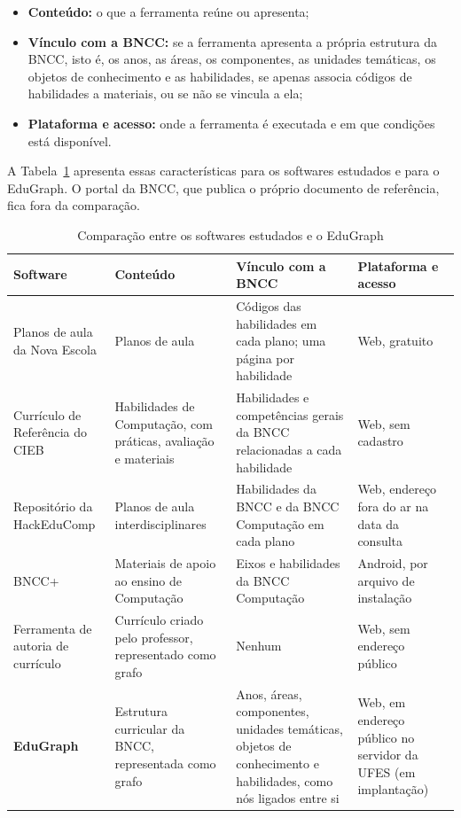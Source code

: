 \begin{itemize}
    \item \textbf{Conteúdo:} o que a ferramenta reúne ou apresenta;
    \item \textbf{Vínculo com a BNCC:} se a ferramenta apresenta a própria estrutura da BNCC, isto é, os anos, as áreas, os componentes, as unidades temáticas, os objetos de conhecimento e as habilidades, se apenas associa códigos de habilidades a materiais, ou se não se vincula a ela;
    \item \textbf{Plataforma e acesso:} onde a ferramenta é executada e em que condições está disponível.
\end{itemize}

A Tabela~\ref{tab:comparacao-ferramentas} apresenta essas características para os softwares estudados e para o EduGraph. O portal da BNCC, que publica o próprio documento de referência, fica fora da comparação.

\begin{table}[H]
    \centering
    \caption{Comparação entre os softwares estudados e o EduGraph}
    \label{tab:comparacao-ferramentas}
    \footnotesize
    \renewcommand{\arraystretch}{1.25}
    \begin{tabular}{|>{\raggedright\arraybackslash}p{3.2cm}|>{\raggedright\arraybackslash}p{4.0cm}|>{\raggedright\arraybackslash}p{4.6cm}|>{\raggedright\arraybackslash}p{3.6cm}|}
        \hline
        \textbf{Software} & \textbf{Conteúdo} & \textbf{Vínculo com a BNCC} & \textbf{Plataforma e acesso} \\
        \hline
        Planos de aula da Nova Escola & Planos de aula & Códigos das habilidades em cada plano; uma página por habilidade & Web, gratuito \\
        \hline
        Currículo de Referência do CIEB & Habilidades de Computação, com práticas, avaliação e materiais & Habilidades e competências gerais da BNCC relacionadas a cada habilidade & Web, sem cadastro \\
        \hline
        Repositório da HackEduComp & Planos de aula interdisciplinares & Habilidades da BNCC e da BNCC Computação em cada plano & Web, endereço fora do ar na data da consulta \\
        \hline
        BNCC+ & Materiais de apoio ao ensino de Computação & Eixos e habilidades da BNCC Computação & Android, por arquivo de instalação \\
        \hline
        Ferramenta de autoria de currículo & Currículo criado pelo professor, representado como grafo & Nenhum & Web, sem endereço público \\
        \hline
        \textbf{EduGraph} & Estrutura curricular da BNCC, representada como grafo & Anos, áreas, componentes, unidades temáticas, objetos de conhecimento e habilidades, como nós ligados entre si & Web, em endereço público no servidor da UFES (em implantação) \\
        \hline
    \end{tabular}
\end{table}

